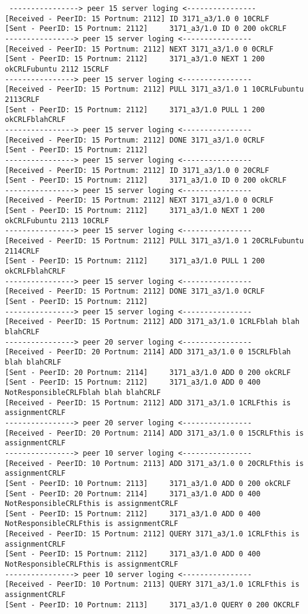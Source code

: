 \documentclass[11pt,a4paper,titlepage]{article}
\begin{document}
\begin{verbatim}
 ----------------> peer 15 server loging <----------------
[Received - PeerID: 15 Portnum: 2112] ID 3171_a3/1.0 0 10CRLF
[Sent - PeerID: 15 Portnum: 2112]     3171_a3/1.0 ID 0 200 okCRLF
----------------> peer 15 server loging <----------------
[Received - PeerID: 15 Portnum: 2112] NEXT 3171_a3/1.0 0 0CRLF
[Sent - PeerID: 15 Portnum: 2112]     3171_a3/1.0 NEXT 1 200 okCRLFubuntu 2112 15CRLF
----------------> peer 15 server loging <----------------
[Received - PeerID: 15 Portnum: 2112] PULL 3171_a3/1.0 1 10CRLFubuntu 2113CRLF
[Sent - PeerID: 15 Portnum: 2112]     3171_a3/1.0 PULL 1 200 okCRLFblahCRLF
----------------> peer 15 server loging <----------------
[Received - PeerID: 15 Portnum: 2112] DONE 3171_a3/1.0 0CRLF
[Sent - PeerID: 15 Portnum: 2112]     
----------------> peer 15 server loging <----------------
[Received - PeerID: 15 Portnum: 2112] ID 3171_a3/1.0 0 20CRLF
[Sent - PeerID: 15 Portnum: 2112]     3171_a3/1.0 ID 0 200 okCRLF
----------------> peer 15 server loging <----------------
[Received - PeerID: 15 Portnum: 2112] NEXT 3171_a3/1.0 0 0CRLF
[Sent - PeerID: 15 Portnum: 2112]     3171_a3/1.0 NEXT 1 200 okCRLFubuntu 2113 10CRLF
----------------> peer 15 server loging <----------------
[Received - PeerID: 15 Portnum: 2112] PULL 3171_a3/1.0 1 20CRLFubuntu 2114CRLF
[Sent - PeerID: 15 Portnum: 2112]     3171_a3/1.0 PULL 1 200 okCRLFblahCRLF
----------------> peer 15 server loging <----------------
[Received - PeerID: 15 Portnum: 2112] DONE 3171_a3/1.0 0CRLF
[Sent - PeerID: 15 Portnum: 2112]     
----------------> peer 15 server loging <----------------
[Received - PeerID: 15 Portnum: 2112] ADD 3171_a3/1.0 1CRLFblah blah blahCRLF
----------------> peer 20 server loging <----------------
[Received - PeerID: 20 Portnum: 2114] ADD 3171_a3/1.0 0 15CRLFblah blah blahCRLF
[Sent - PeerID: 20 Portnum: 2114]     3171_a3/1.0 ADD 0 200 okCRLF
[Sent - PeerID: 15 Portnum: 2112]     3171_a3/1.0 ADD 0 400 NotResponsibleCRLFblah blah blahCRLF
[Received - PeerID: 15 Portnum: 2112] ADD 3171_a3/1.0 1CRLFthis is assignmentCRLF
----------------> peer 20 server loging <----------------
[Received - PeerID: 20 Portnum: 2114] ADD 3171_a3/1.0 0 15CRLFthis is assignmentCRLF
----------------> peer 10 server loging <----------------
[Received - PeerID: 10 Portnum: 2113] ADD 3171_a3/1.0 0 20CRLFthis is assignmentCRLF
[Sent - PeerID: 10 Portnum: 2113]     3171_a3/1.0 ADD 0 200 okCRLF
[Sent - PeerID: 20 Portnum: 2114]     3171_a3/1.0 ADD 0 400 NotResponsibleCRLFthis is assignmentCRLF
[Sent - PeerID: 15 Portnum: 2112]     3171_a3/1.0 ADD 0 400 NotResponsibleCRLFthis is assignmentCRLF
[Received - PeerID: 15 Portnum: 2112] QUERY 3171_a3/1.0 1CRLFthis is assignmentCRLF
[Sent - PeerID: 15 Portnum: 2112]     3171_a3/1.0 ADD 0 400 NotResponsibleCRLFthis is assignmentCRLF
----------------> peer 10 server loging <----------------
[Received - PeerID: 10 Portnum: 2113] QUERY 3171_a3/1.0 1CRLFthis is assignmentCRLF
[Sent - PeerID: 10 Portnum: 2113]     3171_a3/1.0 QUERY 0 200 OKCRLF


\end{verbatim}
\end{document}
